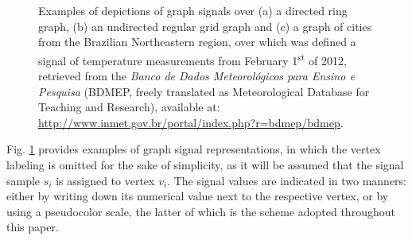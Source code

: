 \begin{figure}
	\centering
	\caption{Examples of depictions of graph signals over (a) a directed ring graph,
		(b) an undirected regular grid graph and (c) a graph of cities from the Brazilian Northeastern region, over which was defined a signal of temperature measurements from February 1\textsuperscript{st} of 2012, retrieved from the
		\emph{Banco de Dados Meteorol\'ogicos para Ensino e Pesquisa} (BDMEP, freely translated as Meteorological Database for Teaching and Research), available at: \url{http://www.inmet.gov.br/portal/index.php?r=bdmep/bdmep}.}%
	\label{fig:graphs}%
	\vspace{-0.2cm}
\end{figure}


Fig. \ref{fig:graphs} provides examples of graph signal representations, in which the vertex labeling is omitted for the sake of simplicity, as it will be assumed that the signal sample $ s_i $ is assigned to vertex $ v_i $. The signal values are indicated in two manners: either by writing down its numerical value next to the respective vertex, or by using a pseudocolor scale, the latter of which is the scheme adopted throughout this paper.

